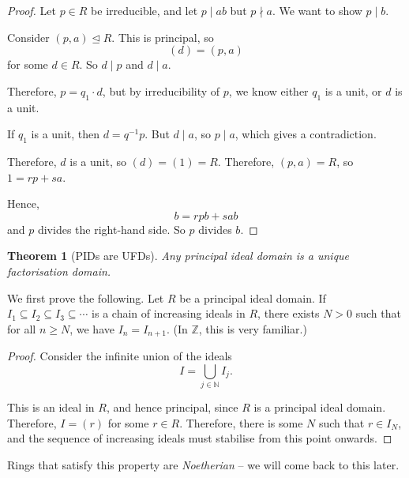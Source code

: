 \documentclass{article}
\newtheorem{theorem}{Theorem}[section]
\theoremstyle{definition}
\theoremstyle{remark}
\newcommand{\pqty}[1]{\left(#1\right)}
\newcommand{\inverse}{^{-1}}
\newcommand{\idealsub}{\trianglelefteq}
\newcommand{\divides}{\mid}
\newcommand{\notdivides}{\nmid}
\newcommand{\ZZ}{\mathbb{Z}}
\newcommand{\NN}{\mathbb{N}}
\begin{document}
\begin{proof}
    Let \(p \in R\) be irreducible, and let \(p \divides ab\) but \(p \notdivides a\). We want to show \(p \divides b\).

    Consider \(\pqty{p, a} \idealsub R\). This is principal, so
    \[
        \pqty{d} = \pqty{p, a}
    \]
    for some \(d \in R\). So \(d \divides p\) and \(d \divides a\).

    Therefore, \(p = q_1 \cdot d\), but by irreducibility of \(p\), we know either \(q_1\) is a unit, or \(d\) is a unit.

    If \(q_1\) is a unit, then \(d = q\inverse p\). But \(d \divides a\), so \(p \divides a\), which gives a contradiction.

    Therefore, \(d\) is a unit, so \(\pqty{d} = \pqty{1} = R\). Therefore, \(\pqty{p, a} = R\), so \(1 = rp + sa\).

    Hence,
    \[
        b = r p b + s a b
    \]
    and \(p\) divides the right-hand side. So \(p\) divides \(b\).
\end{proof}

\begin{theorem}[PIDs are UFDs]
    \label{thm:pid-ufd}%
    Any principal ideal domain is a unique factorisation domain.
\end{theorem}

We first prove the following. Let \(R\) be a principal ideal domain. If \(I_1 \subseteq I_2 \subseteq I_3 \subseteq \cdots\) is a chain of increasing ideals in \(R\), there exists \(N > 0\) such that for all \(n \geq N\), we have \(I_n = I_{n + 1}\). (In \(\ZZ\), this is very familiar.)

\begin{proof}
    Consider the infinite union of the ideals
    \[
        I = \bigcup_{j \in \NN} I_j.
    \]

    This is an ideal in \(R\), and hence principal, since \(R\) is a principal ideal domain. Therefore, \(I = \pqty{r}\) for some \(r \in R\). Therefore, there is some \(N\) such that \(r \in I_N\), and the sequence of increasing ideals must stabilise from this point onwards.
\end{proof}

Rings that satisfy this property are \emph{Noetherian} -- we will come back to this later.
\end{document}
